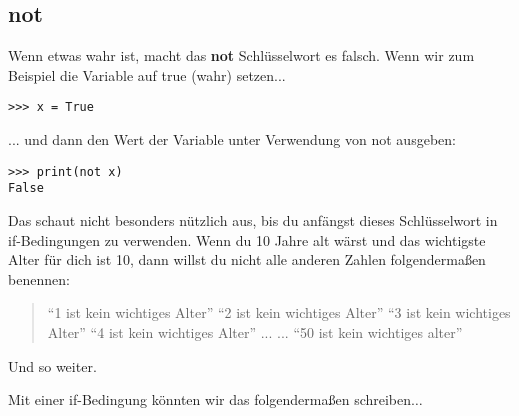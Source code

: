 \subsection*{not}

Wenn etwas wahr ist, macht das \textbf{not} Schlüsselwort es falsch. Wenn wir zum Beispiel die Variable  auf true (wahr) setzen...

\begin{Verbatim}[frame=single]
>>> x = True
\end{Verbatim}

... und dann den Wert der Variable unter Verwendung von not ausgeben:

\begin{Verbatim}[frame=single]
>>> print(not x)
False
\end{Verbatim}

Das schaut nicht besonders nützlich aus, bis du anfängst dieses Schlüsselwort in if-Bedingungen zu verwenden. Wenn du 10 Jahre alt wärst und das wichtigste Alter für dich ist 10, dann willst du nicht alle anderen Zahlen folgendermaßen benennen:

\begin{quotation}
``1 ist kein wichtiges Alter''
``2 ist kein wichtiges Alter''
``3 ist kein wichtiges Alter''
``4 ist kein wichtiges Alter''
...
...
``50 ist kein wichtiges alter''
\end{quotation}

Und so weiter.
\par\noindent
Mit einer if-Bedingung könnten wir das folgendermaßen schreiben\texorpdfstring{$\ldots$}{...}

